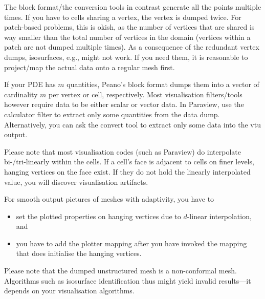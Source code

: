 The block format/the conversion tools in contrast generate all the points
multiple times.
If you have to cells sharing a vertex, the vertex is dumped twice.
For patch-based problems, this is okish, as the number of vertices that are
shared is way smaller than the total number of vertices in the domain (vertices
within a patch are not dumped multiple times).
As a consequence of the redundant vertex dumps, isosurfaces, e.g., might not
work.
If you need them, it is reasonable to project/map the actual data onto a regular
mesh first.


If your PDE has $m$ quantities, Peano's block format dumps them into a vector of
cardinality $m$ per vertex or cell, respectively. 
Most visualisation filters/tools however require data to be either scalar or 
vector data. 
In Paraview, use the calculator filter to extract only some quantities from the 
data dump.
Alternatively, you can ask the convert tool to extract only some data into the
vtu output.

\noindent
Please note that most visualisation codes (such as Paraview) do interpolate
bi-/tri-linearly within the cells. 
If a cell's face is adjacent to cells on finer levels, hanging vertices on the
face exist.
If they do not hold the linearly interpolated value, you will discover
visualisation artifacts.

\begin{remark}
  For smooth output pictures of meshes with adaptivity, you have to 
  \begin{itemize}
    \item set the plotted properties on hanging vertices due to $d$-linear
    interpolation, and
    \item you have to add the plotter mapping after you have invoked the mapping
    that does initialise the hanging vertices.
  \end{itemize}
\end{remark}


\noindent
Please note that the dumped unstructured mesh is a non-conformal mesh. 
Algorithms such as isosurface identification thus might yield invalid
results---it depends on your visualisation algorithms.


